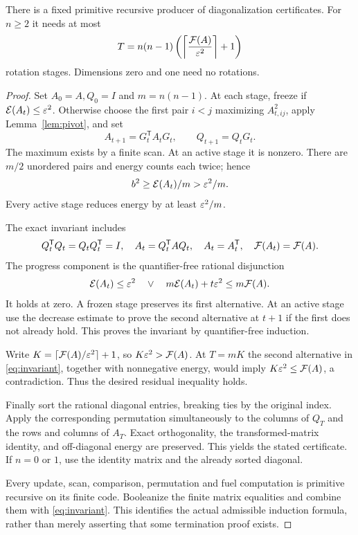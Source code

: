 \begin{theorem}
\label{thm:jacobi}
There is a fixed primitive recursive producer of diagonalization certificates. For $n\ge2$ it needs at most
\begin{equation}
 T=n(n-1)\left(\left\lceil\frac{\mathcal F(A)}{\varepsilon^2}\right\rceil+1\right)
 \label{eq:fuel}
\end{equation}
rotation stages. Dimensions zero and one need no rotations.
\end{theorem}
\begin{proof}
Set $A_0=A,Q_0=I$ and $m=n(n-1)$. At each stage, freeze if $\mathcal E(A_t)\le\varepsilon^2$. Otherwise choose the first pair $i<j$ maximizing $A_{t,ij}^2$, apply Lemma~\ref{lem:pivot}, and set
\[
 A_{t+1}=G_t^{\mathsf T}A_tG_t,
 \qquad Q_{t+1}=Q_tG_t.
\]
The maximum exists by a finite scan. At an active stage it is nonzero. There are $m/2$ unordered pairs and energy counts each twice; hence
\[
 b^2\ge\mathcal E(A_t)/m>\varepsilon^2/m.
\]
Every active stage reduces energy by at least $\varepsilon^2/m$.

The exact invariant includes
\[
 Q_t^{\mathsf T}Q_t=Q_tQ_t^{\mathsf T}=I,\quad
 A_t=Q_t^{\mathsf T}AQ_t,\quad A_t=A_t^{\mathsf T},\quad
 \mathcal F(A_t)=\mathcal F(A).
\]
The progress component is the quantifier-free rational disjunction
\begin{equation}
 \mathcal E(A_t)\le\varepsilon^2
 \quad\lor\quad
 m\mathcal E(A_t)+t\varepsilon^2\le m\mathcal F(A). \label{eq:invariant}
\end{equation}
It holds at zero. A frozen stage preserves its first alternative. At an active stage use the decrease estimate to prove the second alternative at $t+1$ if the first does not already hold. This proves the invariant by quantifier-free induction.

Write $K=\lceil\mathcal F(A)/\varepsilon^2\rceil+1$, so $K\varepsilon^2>\mathcal F(A)$. At $T=mK$ the second alternative in \eqref{eq:invariant}, together with nonnegative energy, would imply $K\varepsilon^2\le\mathcal F(A)$, a contradiction. Thus the desired residual inequality holds.

Finally sort the rational diagonal entries, breaking ties by the original index. Apply the corresponding permutation simultaneously to the columns of $Q_T$ and the rows and columns of $A_T$. Exact orthogonality, the transformed-matrix identity, and off-diagonal energy are preserved. This yields the stated certificate. If $n=0$ or $1$, use the identity matrix and the already sorted diagonal.

Every update, scan, comparison, permutation and fuel computation is primitive recursive on its finite code. Booleanize the finite matrix equalities and combine them with \eqref{eq:invariant}. This identifies the actual admissible induction formula, rather than merely asserting that some termination proof exists.
\end{proof}

